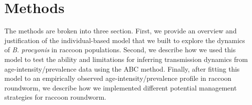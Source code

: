 \documentclass[11pt]{article}
\begin{document}


\section{Methods}

The methods are broken into three section.  First, we provide an overview and justification of the individual-based model that we built to explore the dynamics of \emph{B. procyonis} in raccoon populations. Second, we describe how we used this model to test the ability and limitations for inferring transmission dynamics from age-intensity/prevalence data using the ABC method. Finally, after fitting this model to an empirically observed age-intensity/prevalence profile in raccoon roundworm, we describe how we implemented different potential management strategies for raccoon roundworm.
\end{document}
